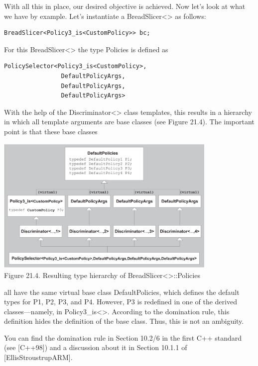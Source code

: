 With all this in place, our desired objective is achieved. Now let’s look at what we have by example. Let’s instantiate a BreadSlicer<> as follows:

\begin{lstlisting}[style=styleCXX]
BreadSlicer<Policy3_is<CustomPolicy>> bc;
\end{lstlisting}

For this BreadSlicer<> the type Policies is defined as

\begin{lstlisting}[style=styleCXX]
PolicySelector<Policy3_is<CustomPolicy>,
				DefaultPolicyArgs,
				DefaultPolicyArgs,
				DefaultPolicyArgs>
\end{lstlisting}

With the help of the Discriminator<> class templates, this results in a hierarchy in which all template arguments are base classes (see Figure 21.4). The important point is that these base classes

\begin{center}
\includegraphics[width=0.8\textwidth]{content/3/chapter21/images/4.png} \\
Figure 21.4. Resulting type hierarchy of BreadSlicer<>::Policies
\end{center}

all have the same virtual base class DefaultPolicies, which defines the default types for P1, P2, P3, and P4. However, P3 is redefined in one of the derived classes—namely, in Policy3\_is<>. According to the domination rule, this definition hides the definition of the base class. Thus, this is not an ambiguity.

\begin{tcolorbox}[colback=webgreen!5!white,colframe=webgreen!75!black]
\hspace*{0.75cm}You can find the domination rule in Section 10.2/6 in the first C++ standard (see [C++98]) and a discussion about it in Section 10.1.1 of [EllisStroustrupARM].
\end{tcolorbox}

